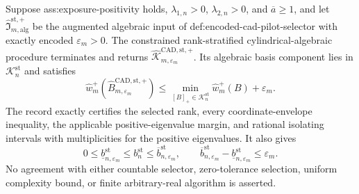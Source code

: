 Suppose ass:exposure-positivity holds, \(\lambda_{1,n}>0\), \(\lambda_{2,n}>0\), and \(\overline a\ge1\), and let \(\widehat{\mathfrak I}_{m,\mathrm{alg}}^{\mathrm{st},+}\) be the augmented algebraic input of def:encoded-cad-pilot-selector with exactly encoded \(\varepsilon_m>0\).  The constrained rank-stratified cylindrical-algebraic procedure terminates and returns \(\widehat{\mathscr K}_{m,\varepsilon_m}^{\mathrm{CAD,st},+}\).  Its algebraic basis component lies in \(\mathcal K_n^{\mathrm{st}}\) and satisfies
\[
\widehat w_m^+(\widehat B_{m,\varepsilon_m}^{\mathrm{CAD,st},+})
\le
\min_{[B]_+\in\mathcal K_n^{\mathrm{st}}}\widehat w_m^+(B)+\varepsilon_m.
\]
The record exactly certifies the selected rank, every coordinate-envelope inequality, the applicable positive-eigenvalue margin, and rational isolating intervals with multiplicities for the positive eigenvalues.  It also gives
\[
0\le\underline b_{n,\varepsilon_m}^{\mathrm{st}}
\le b_n^{\mathrm{st}}
\le\overline b_{n,\varepsilon_m}^{\mathrm{st}},
\qquad
\overline b_{n,\varepsilon_m}^{\mathrm{st}}
-\underline b_{n,\varepsilon_m}^{\mathrm{st}}
\le\varepsilon_m.
\]
No agreement with either countable selector, zero-tolerance selection, uniform complexity bound, or finite arbitrary-real algorithm is asserted.